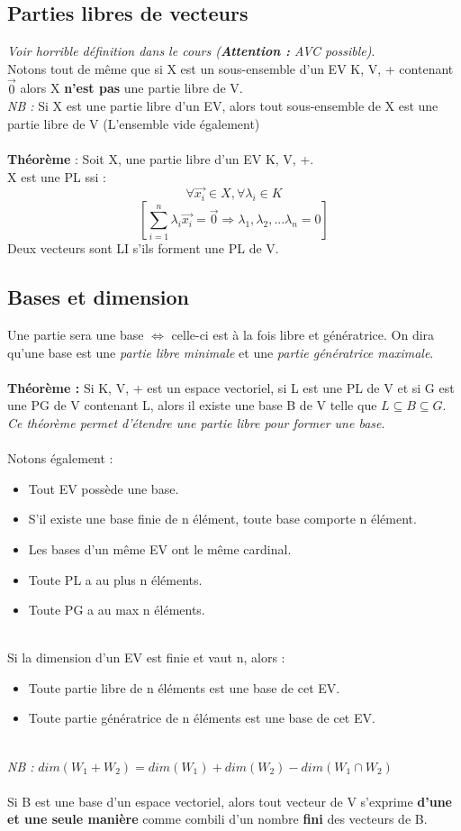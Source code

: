 \documentclass[12pt, a4paper, openany]{article}
\begin{document}
\subsection{Parties libres de vecteurs}
\textit{Voir horrible définition dans le cours (\textbf{Attention :} AVC possible)}.\\
Notons tout de même que si X est un sous-ensemble d'un EV K, V, + contenant $\vec{0}$ alors X \textbf{n'est pas} une partie libre de V.\\
\textit{NB :} Si X est une partie libre d'un EV, alors tout sous-ensemble de X est une partie libre de V (L'ensemble vide également)\\\\
\textbf{Théorème } : Soit X, une partie libre d'un EV K, V, +.\\
X est une PL ssi :
$$\forall \vec{x_{i}} \in X, \forall \lambda_{i} \in K$$
$$[\sum_{i=1}^{n} \lambda_{i}\vec{x_{i}} = \vec{0} \Rightarrow \lambda_{1}, \lambda_{2}, ... \lambda_{n} = 0]$$
Deux vecteurs sont LI s'ils forment une PL de V.

\subsection{Bases et dimension}
Une partie sera une base $\Leftrightarrow$ celle-ci est à la fois libre et génératrice. On dira qu'une base est une \textit{partie libre minimale} et une \textit{partie génératrice maximale}.\\\\
\textbf{Théorème :} Si K, V, + est un espace vectoriel, si L est une PL de V et si G est une PG de V contenant L, alors il existe une base B de V telle que $L \subseteq B \subseteq G$.\\
\textit{Ce théorème permet d'étendre une partie libre pour former une base}.\\\\
Notons également :
\begin{itemize}
\item Tout EV possède une base.
\item S'il existe une base finie de n élément, toute base comporte n élément.
\item Les bases d'un même EV ont le même cardinal.
\item Toute PL a au plus n éléments.
\item Toute PG a au max n éléments.
\end{itemize}
\ \\
Si la dimension d'un EV est finie et vaut n, alors :
\begin{itemize}
\item Toute partie libre de n éléments est une base de cet EV.
\item Toute partie génératrice de n éléments est une base de cet EV.
\end{itemize}
\ \\
\textit{NB :} $dim(W_{1} + W_{2}) = dim(W_{1}) + dim(W_{2}) - dim(W_{1} \cap W_{2})$\\\\
Si B est une base d'un espace vectoriel, alors tout vecteur de V s'exprime \textbf{d'une et une seule manière} comme combili d'un nombre \textbf{fini} des vecteurs de B.
\end{document}
